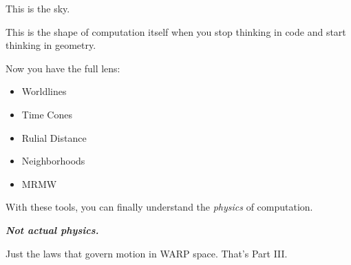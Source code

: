 This is the sky.

This is the shape of computation itself when you stop thinking in code
and start thinking in geometry.

Now you have the full lens:

\begin{itemize}
\tightlist
\item
  Worldlines\\
\item
  Time Cones
\item
  Rulial Distance
\item
  Neighborhoods
\item
  MRMW
\end{itemize}

With these tools, you can finally understand the \emph{physics} of
computation.

\textbf{\emph{Not actual physics.}}

Just the laws that govern motion in WARP space. That's Part III.
